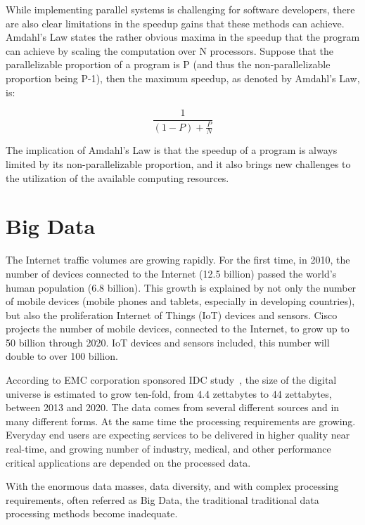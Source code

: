 While implementing parallel systems is challenging for software developers, there are also clear limitations in the speedup gains that these methods can achieve. Amdahl's Law states the rather obvious maxima in the speedup that the program can achieve by scaling the computation over N processors. Suppose that the parallelizable proportion of a program is P (and thus the non-parallelizable proportion being P-1), then the maximum speedup, as denoted by Amdahl's Law, is:~\cite{Amdahl:1967:VSP}

\begin{equation*}
  \frac{1}{(1-P) + \frac{P}{N}}
\end{equation*}

The implication of Amdahl's Law is that the speedup of a program is always limited by its non-parallelizable proportion, and it also brings new challenges to the utilization of the available computing resources.

\section{Big Data}
\label{section:big-data}
The Internet traffic volumes are growing rapidly. For the first time, in 2010, the number of devices connected to the Internet (12.5 billion) passed the world's human population (6.8 billion). This growth is explained by not only the number of mobile devices (mobile phones and tablets, especially in developing countries), but also the proliferation Internet of Things (IoT) devices and sensors. Cisco projects the number of mobile devices, connected to the Internet, to grow up to 50 billion through 2020. IoT devices and sensors included, this number will double to over 100 billion.~\cite{Evans:2011:IoT}

According to EMC corporation sponsored IDC study~\cite{Turner:2014:Digital}, the size of the digital universe is estimated to grow ten-fold, from 4.4 zettabytes to 44 zettabytes, between 2013 and 2020. The data comes from several different sources and in many different forms. At the same time the processing requirements are growing. Everyday end users are expecting services to be delivered in higher quality near real-time, and growing number of industry, medical, and other performance critical applications are depended on the processed data.

With the enormous data masses, data diversity, and with complex processing requirements, often referred as Big Data, the traditional traditional data processing methods become inadequate.

